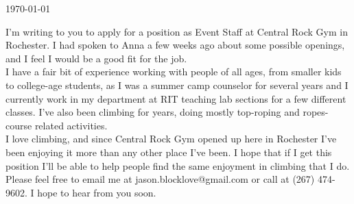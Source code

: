 \documentclass[11pt, letterpaper]{awesome-cv}
\begin{document}
\makecvheader[C]

\makecvfooter
  {\today}
  {}
  {}

\makelettertitle

\begin{cvletter}

	I'm writing to you to apply for a position as Event Staff at Central Rock Gym in Rochester. I had spoken to Anna a few weeks ago about some possible openings, and I feel I would be a good fit for the job.\\

	I have a fair bit of experience working with people of all ages, from smaller kids to college-age students, as I was a summer camp counselor for several years and I currently work in my department at RIT teaching lab sections for a few different classes. I've also been climbing for years, doing mostly top-roping and ropes-course related activities.\\

	I love climbing, and since Central Rock Gym opened up here in Rochester I've been enjoying it more than any other place I've been. I hope that if I get this position I'll be able to help people find the same enjoyment in climbing that I do.\\

	Please feel free to email me at jason.blocklove@gmail.com or call at (267) 474-9602. I hope to hear from you soon.

\end{cvletter}


\makeletterclosing
\end{document}
